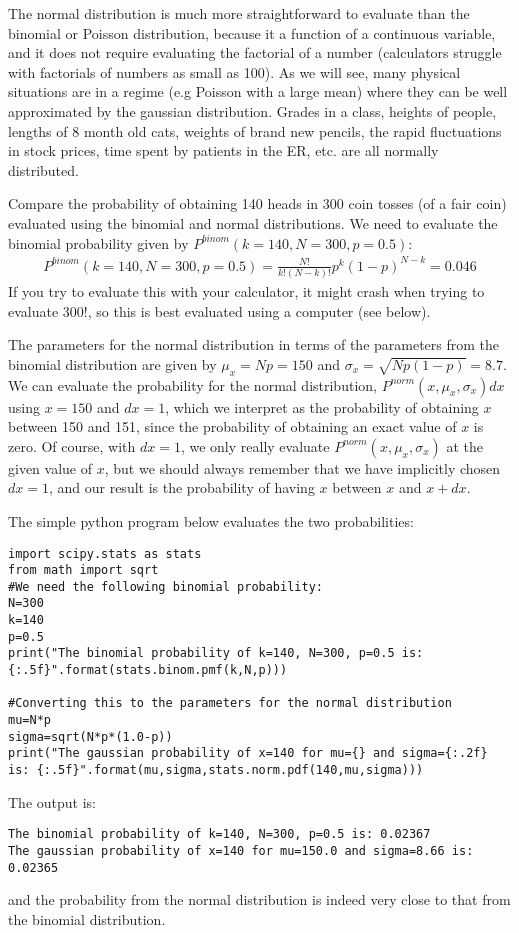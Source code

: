 The normal distribution is much more straightforward to evaluate than the binomial or Poisson distribution, because it a function of a continuous variable, and it does not require evaluating the factorial of a number (calculators struggle with factorials of numbers as small as 100). As we will see, many physical situations are in a regime (e.g Poisson with a large mean) where they can be well approximated by the gaussian distribution. Grades in a class, heights of people, lengths of 8 month old cats, weights of brand new pencils, the rapid fluctuations in stock prices, time spent by patients in the ER, etc. are all normally distributed. 
\clearpage
\begin{example}{}{Compare the probability of obtaining 140 heads in 300 coin tosses (of a fair coin) evaluated using the binomial and normal distributions.}{}
We need to evaluate the binomial probability given by $P^{binom}(k=140,N=300,p=0.5)$:
\begin{align*}
P^{binom}(k=140,N=300,p=0.5)=\frac{N!}{k!(N-k)!}p^k(1-p)^{N-k}=0.046
\end{align*}
If you try to evaluate this with your calculator, it might crash when trying to evaluate $300!$, so this is best evaluated using a computer (see below).

The parameters for the normal distribution in terms of the parameters from the binomial distribution are given by $\mu_x=Np=150$ and $\sigma_x=\sqrt{Np(1-p)}=8.7$. We can evaluate the probability for the normal distribution, $P^{norm}(x,\mu_x,\sigma_x)dx$ using $x=150$ and $dx=1$, which we interpret as the probability of obtaining $x$ between 150 and 151, since the probability of obtaining an exact value of $x$ is zero. Of course, with $dx=1$, we only really evaluate $P^{norm}(x,\mu_x,\sigma_x)$ at the given value of $x$, but we should always remember that we have implicitly chosen $dx=1$, and our result is the probability of having $x$ between $x$ and $x+dx$. 

The simple python program below evaluates the two probabilities:  
\begin{lstlisting}
import scipy.stats as stats
from math import sqrt
#We need the following binomial probability:
N=300
k=140
p=0.5
print("The binomial probability of k=140, N=300, p=0.5 is: {:.5f}".format(stats.binom.pmf(k,N,p)))

#Converting this to the parameters for the normal distribution
mu=N*p
sigma=sqrt(N*p*(1.0-p))
print("The gaussian probability of x=140 for mu={} and sigma={:.2f} is: {:.5f}".format(mu,sigma,stats.norm.pdf(140,mu,sigma)))
\end{lstlisting}
The output is:
\begin{verbatim}
The binomial probability of k=140, N=300, p=0.5 is: 0.02367
The gaussian probability of x=140 for mu=150.0 and sigma=8.66 is: 0.02365
\end{verbatim}
and the probability from the normal distribution is indeed very close to that from the binomial distribution.
\end{example}

